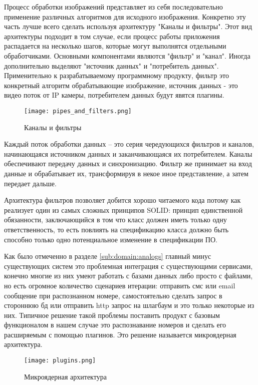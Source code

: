 Процесс обработки изображений представляет из себя последовательно применение различных алгоритмов для исходного изображения. Конкретно эту часть лучше всего сделать используя архитектуру "Каналы и фильтры". Этот вид архитектуры подходит в том случае, если процесс работы приложения распадается на несколько шагов, которые могут выполнятся отдельными обработчиками. Основными компонентами являются "фильтр" и "канал". Иногда дополнительно выделяют "источник данных" и "потребитель данных". Применительно к разрабатываемому программному продукту, фильтр это конкретный алгоритм обрабатывающие изображение, источник данных - это видео поток от IP камеры, потребителем данных будут явятся плагины.

\begin{figure}[ht] 
    \centering
    \texttt{[image: pipes\_and\_filters.png]}  
    \caption{Каналы и фильтры}
    \label{fig:arch_arch:pipes_and_filters}
\end{figure}

Каждый поток обработки данных – это серия чередующихся фильтров и каналов, начинающаяся источником данных и заканчивающаяся их потребителем. Каналы обеспечивают передачу данных и синхронизацию. Фильтр же принимает на вход данные и обрабатывает их, трансформируя в некое иное представление, а затем передает дальше.

Архитектура фильтров позволяет добится хорошо читаемого кода потому как реализует один из самых сложных принципов SOLID: принцип единственной обязанности, заключающийся в том что класс должен иметь только одну ответственность, то есть повлиять на спецификацию класса должно быть способно только одно потенциальное изменение в спецификации ПО. 

Как было отмеченно в разделе \ref{sub:domain:analogs} главный минус существующих систем это проблемная интеграция с существующими сервисами, конечно многие из них умеют работать с базами данных либо просто с файлами, но есть огромное количество сценариев итерации: отправить смс или email сообщение при распознанном номере, самостоятельно сделать запрос в стороннюю бд или отправить http запрос на шлагбаум и это только некоторые из них. Типичное решение такой проблемы поставить продукт с базовым функционалом в нашем случае это распознавание номеров и сделать его расширяемым с помощью плагинов. Это решение называется микроядерная архитектура. 

\begin{figure}[ht] 
    \centering
    \texttt{[image: plugins.png]}  
    \caption{Микроядерная архитектура}
    \label{fig:arch_arch:plugins}
\end{figure}

